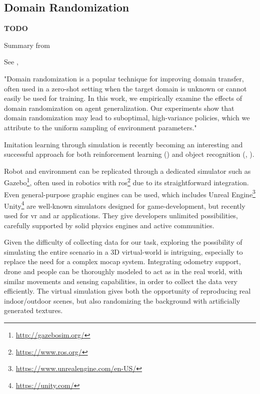 \subsection{Domain Randomization}
\label{subsec:domain-randomization}

\textbf{TODO}

Summary from \cite{mehta2019active}

See \cite{weng2019DR_explanation}, \cite{tobin2017domain}
 
"Domain randomization is a popular technique for improving domain transfer, often used in a zero-shot setting when the target domain is unknown or cannot easily be used for training. In this work, we empirically examine the effects of domain randomization on agent generalization. Our experiments show that domain randomization may lead to suboptimal, high-variance policies, which we attribute to the uniform sampling of environment parameters."

\medskip

Imitation learning through simulation is recently becoming an interesting and successful approach for both reinforcement learning (\cite{imitation_learning_3d_navigation}) and object recognition (\cite{tobin2017domain}, \cite{weng2019DR}).

Robot and environment can be replicated through a dedicated simulator such as Gazebo\footnote{\url{http://gazebosim.org/}}, often used in robotics with \gls{ros}\footnote{\url{https://www.ros.org/}} due to its straightforward integration. Even general-purpose graphic engines can be used, which includes Unreal Engine\footnote{\url{https://www.unrealengine.com/en-US/}} Unity\footnote{\url{https://unity.com/}} are well-known simulators designed for game-development, but recently used for \gls{vr} and \gls{ar} applications. They give developers unlimited possibilities, carefully supported by solid physics engines and active communities.

\medskip

Given the difficulty of collecting data for our task, exploring the possibility of simulating the entire scenario in a 3D virtual-world is intriguing, especially to replace the need for a complex \gls{mocap} system. Integrating odometry support, drone and people can be thoroughly modeled to act as in the real world, with similar movements and sensing capabilities, in order to collect the data very efficiently. The virtual simulation gives both the opportunity of reproducing real indoor/outdoor scenes, but also randomizing the background with artificially generated textures.

